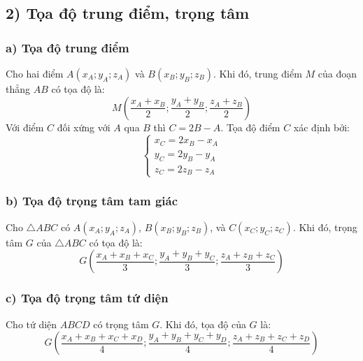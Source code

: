 \documentclass[12pt,a4paper]{extarticle}
\begin{document}
\subsection*{2) Tọa độ trung điểm, trọng tâm}
\subsubsection*{a) Tọa độ trung điểm}
\noindent Cho hai điểm $A(x_A; y_A; z_A)$ và $B(x_B; y_B; z_B)$. Khi đó, trung điểm $M$ của đoạn thẳng $AB$ có tọa độ là:
\[
M\left(\frac{x_A + x_B}{2}; \frac{y_A + y_B}{2}; \frac{z_A + z_B}{2}\right)
\]
\noindent Với điểm $C$ đối xứng với $A$ qua $B$ thì $C = 2B - A$. Tọa độ điểm $C$ xác định bởi:
\[
\begin{cases}
    x_C = 2x_B - x_A \\
    y_C = 2y_B - y_A \\
    z_C = 2z_B - z_A
\end{cases}
\]
\subsubsection*{b) Tọa độ trọng tâm tam giác}
\noindent Cho $\triangle ABC$ có $A(x_A; y_A; z_A)$, $B(x_B; y_B; z_B)$, và $C(x_C; y_C; z_C)$. Khi đó, trọng tâm $G$ của $\triangle ABC$ có tọa độ là:
\[
G\left(\frac{x_A + x_B + x_C}{3}; \frac{y_A + y_B + y_C}{3}; \frac{z_A + z_B + z_C}{3}\right)
\]
\subsubsection*{c) Tọa độ trọng tâm tứ diện}
\noindent Cho tứ diện $ABCD$ có trọng tâm $G$. Khi đó, tọa độ của $G$ là:
\[
G\left(\frac{x_A + x_B + x_C + x_D}{4}; \frac{y_A + y_B + y_C + y_D}{4}; \frac{z_A + z_B + z_C + z_D}{4}\right)
\]
\vspace{1.5em}
\end{document}
